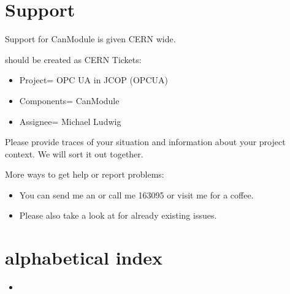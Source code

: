 \documentclass[letterpaper,10pt,english]{sphinxmanual}
\begin{document}
\chapter{Support}
\label{\detokenize{support:support}}\label{\detokenize{support::doc}}
Support for CanModule is given CERN wide.

 should be created as CERN  Tickets:
\begin{itemize}
\item {} 
Project= OPC UA in JCOP (OPCUA)

\item {} 
Components= CanModule

\item {} 
Assignee= Michael Ludwig

\end{itemize}

Please provide traces of your situation and information about your project context. We will sort it out together.

More  ways to get help or report problems:
\begin{itemize}
\item {} 
You can send me an  or call me 163095 or visit me for a coffee.

\item {} 
Please also take a look at  for already existing issues.

\end{itemize}


\chapter{alphabetical index}
\label{\detokenize{index:alphabetical-index}}\begin{itemize}
\item {} 

\end{itemize}



\renewcommand{\indexname}{Index}
\printindex
\end{document}
